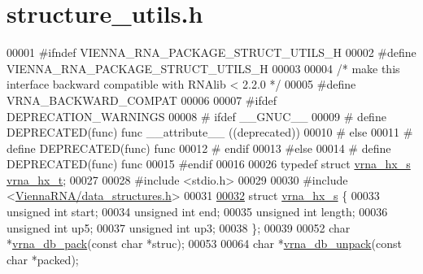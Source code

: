 \hypertarget{structure__utils_8h_source}{\section{structure\+\_\+utils.\+h}
\label{structure__utils_8h_source}
}

\begin{DoxyCode}
00001 \textcolor{preprocessor}{#ifndef VIENNA\_RNA\_PACKAGE\_STRUCT\_UTILS\_H}
00002 \textcolor{preprocessor}{#define VIENNA\_RNA\_PACKAGE\_STRUCT\_UTILS\_H}
00003 
00004 \textcolor{comment}{/* make this interface backward compatible with RNAlib < 2.2.0 */}
00005 \textcolor{preprocessor}{#define VRNA\_BACKWARD\_COMPAT}
00006 
00007 \textcolor{preprocessor}{#ifdef DEPRECATION\_WARNINGS}
00008 \textcolor{preprocessor}{# ifdef \_\_GNUC\_\_}
00009 \textcolor{preprocessor}{#  define DEPRECATED(func) func \_\_attribute\_\_ ((deprecated))}
00010 \textcolor{preprocessor}{# else}
00011 \textcolor{preprocessor}{#  define DEPRECATED(func) func}
00012 \textcolor{preprocessor}{# endif}
00013 \textcolor{preprocessor}{#else}
00014 \textcolor{preprocessor}{# define DEPRECATED(func) func}
00015 \textcolor{preprocessor}{#endif}
00016 
00026 \textcolor{keyword}{typedef} \textcolor{keyword}{struct }\hyperlink{group__struct__utils_structvrna__hx__s}{vrna\_hx\_s}  \hyperlink{group__struct__utils_structvrna__hx__s}{vrna\_hx\_t};
00027 
00028 \textcolor{preprocessor}{#include <stdio.h>}
00029 
00030 \textcolor{preprocessor}{#include <\hyperlink{data__structures_8h}{ViennaRNA/data\_structures.h}>}
00031 
\hypertarget{structure__utils_8h_source_l00032}{}\hyperlink{group__struct__utils}{00032} \textcolor{keyword}{struct }\hyperlink{group__struct__utils_structvrna__hx__s}{vrna\_hx\_s} \{
00033   \textcolor{keywordtype}{unsigned} \textcolor{keywordtype}{int} start;
00034   \textcolor{keywordtype}{unsigned} \textcolor{keywordtype}{int} end;
00035   \textcolor{keywordtype}{unsigned} \textcolor{keywordtype}{int} length;
00036   \textcolor{keywordtype}{unsigned} \textcolor{keywordtype}{int} up5;
00037   \textcolor{keywordtype}{unsigned} \textcolor{keywordtype}{int} up3;
00038 \};
00039 
00052 \textcolor{keywordtype}{char} *\hyperlink{group__struct__utils_ga55c4783060a1464f862f858d5599c9e1}{vrna\_db\_pack}(\textcolor{keyword}{const} \textcolor{keywordtype}{char} *struc);
00053 
00064 \textcolor{keywordtype}{char} *\hyperlink{group__struct__utils_ga6490adff857d84ce06e6f379ae3a4512}{vrna\_db\_unpack}(\textcolor{keyword}{const} \textcolor{keywordtype}{char} *packed);

\end{DoxyCode}
